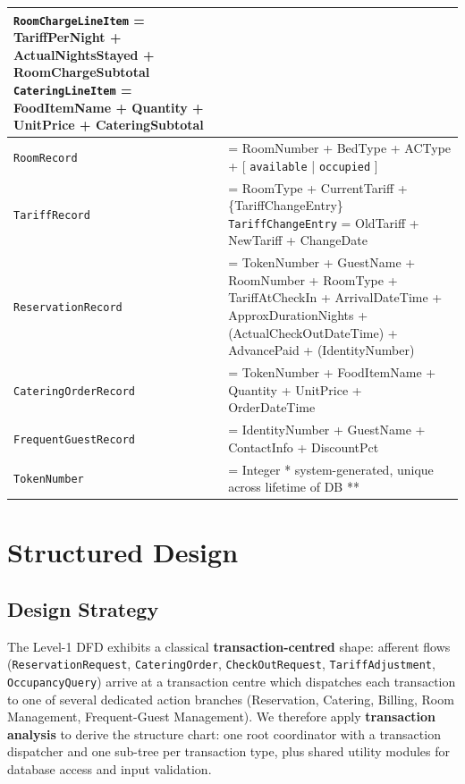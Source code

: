 \documentclass[12pt,a4paper]{article}
\begin{document}
\begin{longtable}{|L{3.8cm}|L{10cm}|}
      \texttt{RoomChargeLineItem} = TariffPerNight + ActualNightsStayed
        + RoomChargeSubtotal \newline
      \texttt{CateringLineItem} = FoodItemName + Quantity + UnitPrice
        + CateringSubtotal \\
  \hline
  \texttt{RoomRecord}
    & = RoomNumber + BedType + ACType
        + [ \texttt{available} | \texttt{occupied} ] \\
  \hline
  \texttt{TariffRecord}
    & = RoomType + CurrentTariff + \{TariffChangeEntry\} \newline
      \texttt{TariffChangeEntry} = OldTariff + NewTariff + ChangeDate \\
  \hline
  \texttt{ReservationRecord}
    & = TokenNumber + GuestName + RoomNumber + RoomType + TariffAtCheckIn
        + ArrivalDateTime + ApproxDurationNights + (ActualCheckOutDateTime)
        + AdvancePaid + (IdentityNumber) \\
  \hline
  \texttt{CateringOrderRecord}
    & = TokenNumber + FoodItemName + Quantity + UnitPrice + OrderDateTime \\
  \hline
  \texttt{FrequentGuestRecord}
    & = IdentityNumber + GuestName + ContactInfo + DiscountPct \\
  \hline
  \texttt{TokenNumber}
    & = Integer \qquad ** system-generated, unique across lifetime of DB ** \\
  \hline
\end{longtable}

\newpage

\section{Structured Design}

\subsection{Design Strategy}

The Level-1 DFD exhibits a classical \textbf{transaction-centred} shape: afferent flows
(\texttt{ReservationRequest}, \texttt{CateringOrder}, \texttt{CheckOutRequest},
\texttt{TariffAdjustment}, \texttt{OccupancyQuery}) arrive at a transaction centre
which dispatches each transaction to one of several dedicated action branches
(Reservation, Catering, Billing, Room Management, Frequent-Guest Management). We
therefore apply \textbf{transaction analysis} to derive the structure chart: one root
coordinator with a transaction dispatcher and one sub-tree per transaction type, plus
shared utility modules for database access and input validation.
\end{document}
